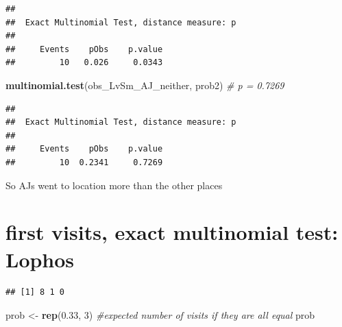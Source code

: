 \documentclass[]{article}
\newenvironment{Shaded}{\begin{snugshade}}{\end{snugshade}}
\newcommand{\KeywordTok}[1]{\textcolor[rgb]{0.13,0.29,0.53}{\textbf{{#1}}}}
\newcommand{\DecValTok}[1]{\textcolor[rgb]{0.00,0.00,0.81}{{#1}}}
\newcommand{\FloatTok}[1]{\textcolor[rgb]{0.00,0.00,0.81}{{#1}}}
\newcommand{\StringTok}[1]{\textcolor[rgb]{0.31,0.60,0.02}{{#1}}}
\newcommand{\CommentTok}[1]{\textcolor[rgb]{0.56,0.35,0.01}{\textit{{#1}}}}
\newcommand{\NormalTok}[1]{{#1}}
\begin{document}
\begin{verbatim}
## 
##  Exact Multinomial Test, distance measure: p
## 
##     Events    pObs    p.value
##         10   0.026     0.0343
\end{verbatim}

\begin{Shaded}
\begin{Highlighting}[]
 \KeywordTok{multinomial.test}\NormalTok{(obs_LvSm_AJ_neither, prob2) }\CommentTok{# p = 0.7269}
\end{Highlighting}
\end{Shaded}

\begin{verbatim}
## 
##  Exact Multinomial Test, distance measure: p
## 
##     Events    pObs    p.value
##         10  0.2341     0.7269
\end{verbatim}

So AJs went to location more than the other places

\section{first visits, exact multinomial test:
Lophos}\label{first-visits-exact-multinomial-test-lophos-1}

\begin{Shaded}
\end{Shaded}

\begin{verbatim}
## [1] 8 1 0
\end{verbatim}

\begin{Shaded}
\begin{Highlighting}[]
\NormalTok{prob <-}\StringTok{ }\KeywordTok{rep}\NormalTok{(}\FloatTok{0.33}\NormalTok{, }\DecValTok{3}\NormalTok{) }\CommentTok{#expected number of visits if they are all equal}
\NormalTok{prob }
\end{Highlighting}
\end{Shaded}
\end{document}
